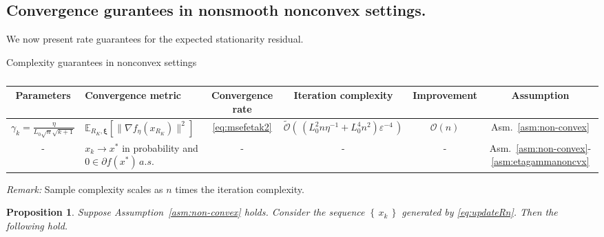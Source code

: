 \documentclass[11pt,reqno]{amsart}
\newcommand{\1}{{\bf 1}}
\newcommand{\2}{{\bf 2}}
\newcommand{\bxi}{\boldsymbol{\xi}}
\numberwithin{equation}{section}
\newtheorem{proposition}{Proposition}[section]
\theoremstyle{remark}
\begin{document}
{	\subsection{Convergence gurantees in nonsmooth nonconvex settings.}\label{sec:5.2}
	We now present rate guarantees for the expected stationarity residual. 
	\begin{table}[H]
		\scriptsize
		\centering
		\caption{}{{Complexity guarantees} in nonconvex settings}
		\renewcommand{\arraystretch}{2}
		\begin{tabular}{ c C{3cm} c c c c}
			\hline
			Parameters&Convergence metric&  Convergence rate &Iteration complexity&Improvement &Assumption\\
			\hline
			$\gamma_k = \frac{\eta}{L_0 \sqrt{n}\sqrt{k+1}}$& $\mathbb{E}_{R_K, \bxi}\left[\|\nabla f_{\eta}(x_{R_K})\|^2\right]$ &\eqref{eq:msefetak2}&${\tilde{\mathcal{O}}}\left(\, \left(L_0^2 n \eta^{-1} + L_0^4 n^2 \right) \varepsilon^{-4} \, \right)$&${\mathcal{O}(n)}$&Asm.~\ref{asm:non-convex}\\          \hline
			- &  $ x_k \rightarrow x^*$ in probability and $0 \in \partial f(x^*)\, a.s.$& - &-&-&Asm.~\ref{asm:non-convex}-\ref{asm:etagammanoncvx}\\
			\hline
		\end{tabular}
		\vspace{0.2em}
		
		{\textit{Remark:} Sample complexity scales as $n$ times the iteration complexity.}
	\end{table}
	\begin{proposition}\label{prop:gradgotozero}
		Suppose Assumption~\ref{asm:non-convex} holds. Consider the sequence $\left\{\, x_k\, \right\}$ generated by \eqref{eq:updateRn}. Then the following hold. 
		

\end{proposition}}
\end{document}
